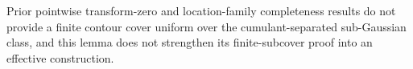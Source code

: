 Prior pointwise transform-zero and location-family completeness results do not provide a finite contour cover uniform over the cumulant-separated sub-Gaussian class, and this lemma does not strengthen its finite-subcover proof into an effective construction.